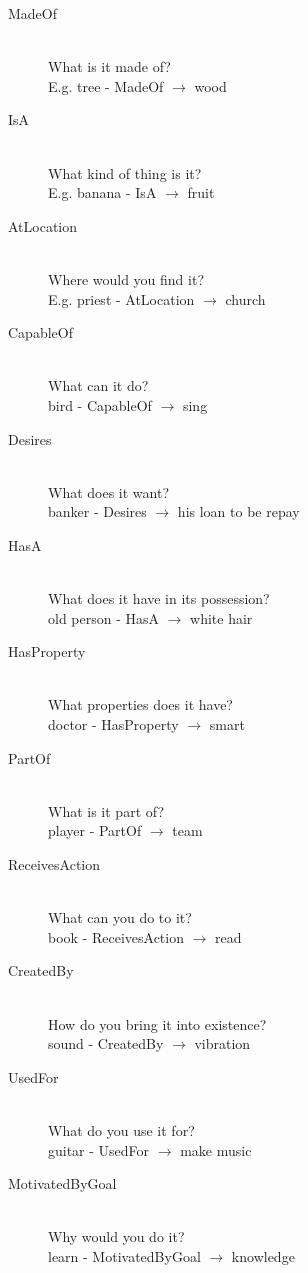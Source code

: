 \begin{description}
\item[MadeOf] \hfill \\ What is it made of? \hfill \\ E.g. tree - MadeOf $\rightarrow$ wood
\item[IsA] \hfill \\ What kind of thing is it? \hfill \\ E.g. banana - IsA $\rightarrow$ fruit
\item[AtLocation] \hfill \\ Where would you find it? \hfill \\ E.g. priest - AtLocation $\rightarrow$ church
\item[CapableOf] \hfill \\ What can it do? \hfill \\ bird - CapableOf $\rightarrow$ sing
\item[Desires] \hfill \\ What does it want? \hfill \\ banker - Desires $\rightarrow$ his loan to be repay
\item[HasA] \hfill \\ What does it have in its possession? \hfill \\ old person - HasA $\rightarrow$ white hair
\item[HasProperty] \hfill \\ What properties does it have? \hfill \\ doctor - HasProperty $\rightarrow$ smart
\item[PartOf] \hfill \\ What is it part of? \hfill \\ player - PartOf $\rightarrow$ team
\item[ReceivesAction] \hfill \\What can you do to it? \hfill \\ book - ReceivesAction $\rightarrow$ read
\item[CreatedBy] \hfill \\ How do you bring it into existence? \hfill \\ sound - CreatedBy $\rightarrow$ vibration
\item[UsedFor] \hfill \\ What do you use it for? \hfill \\ guitar - UsedFor $\rightarrow$ make music
\item[MotivatedByGoal] \hfill \\ Why would you do it? \hfill \\ learn - MotivatedByGoal $\rightarrow$ knowledge

\end{description}
